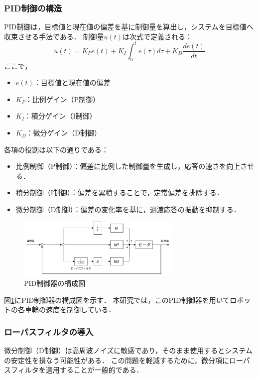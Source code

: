 \subsubsection{PID制御の構造}
PID制御は，目標値と現在値の偏差を基に制御量を算出し，システムを目標値へ収束させる手法である．
制御量$u(t)$は次式で定義される：
\begin{equation}
    u(t) = K_P e(t) + K_I \int_{0}^{t} e(\tau) d\tau + K_D \frac{de(t)}{dt}
    \label{eq:pid}
\end{equation}
ここで，
\begin{itemize}
    \item $e(t)$：目標値と現在値の偏差
    \item $K_P$：比例ゲイン（P制御）
    \item $K_I$：積分ゲイン（I制御）
    \item $K_D$：微分ゲイン（D制御）
\end{itemize}
各項の役割は以下の通りである：
\begin{itemize}
    \item 比例制御（P制御）：偏差に比例した制御量を生成し，応答の速さを向上させる．
    \item 積分制御（I制御）：偏差を累積することで，定常偏差を排除する．
    \item 微分制御（D制御）：偏差の変化率を基に，過渡応答の振動を抑制する．
\end{itemize}

\begin{figure}[h]
    \centering
    \includegraphics[width=0.7\textwidth]{figure/pid.pdf}
    \caption{PID制御器の構成図}
    \label{fig:pid_controller}
\end{figure}

図\ref{fig:pid_controller}にPID制御器の構成図を示す．
本研究では，このPID制御器を用いてロボットの各車輪の速度を制御している．

\subsubsection{ローパスフィルタの導入}
微分制御（D制御）は高周波ノイズに敏感であり，そのまま使用するとシステムの安定性を損なう可能性がある．
この問題を軽減するために，微分項にローパスフィルタを適用することが一般的である．


